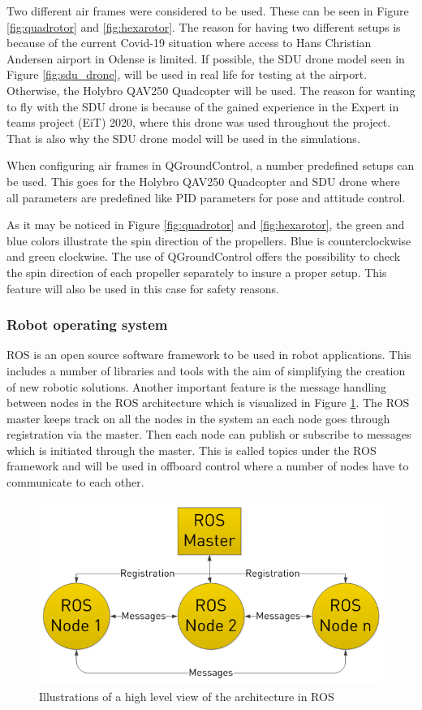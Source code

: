 \documentclass[../Head/report.tex]{subfiles}
\begin{document}
Two different air frames were considered to be used. These can be seen in Figure \ref{fig:quadrotor} and \ref{fig:hexarotor}. The reason for having two different setups is because of the current Covid-19 situation where access to Hans Christian Andersen airport in Odense is limited. If possible, the SDU drone model seen in Figure \ref{fig:sdu_drone}, will be used in real life for testing at the airport. Otherwise, the Holybro QAV250 Quadcopter will be used. The reason for wanting to fly with the SDU drone is because of the gained experience in the Expert in teams project (EiT) 2020, where this drone was used throughout the project. That is also why the SDU drone model will be used in the simulations. 

When configuring air frames in QGroundControl, a number predefined setups can be used. This goes for the Holybro QAV250 Quadcopter and SDU drone where all parameters are predefined like PID parameters for pose and attitude control.

As it may be noticed in Figure \ref{fig:quadrotor} and \ref{fig:hexarotor}, the green and blue colors illustrate the spin direction of the propellers. Blue is counterclockwise and green clockwise. The use of QGroundControl offers the possibility to check the spin direction of each propeller separately to insure a proper setup. This feature will also be used in this case for safety reasons.  


\subsubsection{Robot operating system}
\label{sec:ros}

\subsub
ROS is an open source software framework to be used in robot applications. This includes a number of libraries and tools with the aim of simplifying the creation of new robotic solutions. Another important feature is the message handling between nodes in the ROS architecture which is visualized in Figure \ref{fig:ros}. The ROS master keeps track on all the nodes in the system an each node goes through registration via the master. Then each node can publish or subscribe to messages which is initiated through the master. This is called topics under the ROS framework and will be used in offboard control where a number of nodes have to communicate to each other.  

\begin{figure}[H]
    \centering
    \includegraphics[width=0.6\linewidth]{../Figures/ros.png}
    \caption{Illustrations of a high level view of the architecture in ROS}
    \label{fig:ros}
\end{figure}
\end{document}
